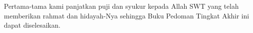 \begin{acknowledgements}
Pertama-tama kami panjatkan puji dan syukur kepada Allah SWT yang telah memberikan rahmat dan hidayah-Nya sehingga Buku Pedoman Tingkat Akhir ini dapat diselesaikan.
\end{acknowledgements}